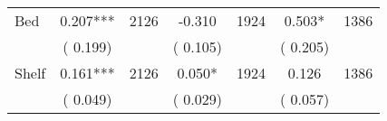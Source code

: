 \begin{tabular}{l*{6}{c}}
Bed        &              0.207***      &       2126       &             -0.310      &       1924       &              0.503*      &       1386       \\
                       &       (       0.199)            &                               &       (       0.105)            &                               &       (       0.205)            &                               \\
Shelf        &              0.161***      &       2126       &              0.050*      &       1924       &              0.126      &       1386       \\
                       &       (       0.049)            &                               &       (       0.029)            &                               &       (       0.057)            &                               \\
\hline \end{tabular}